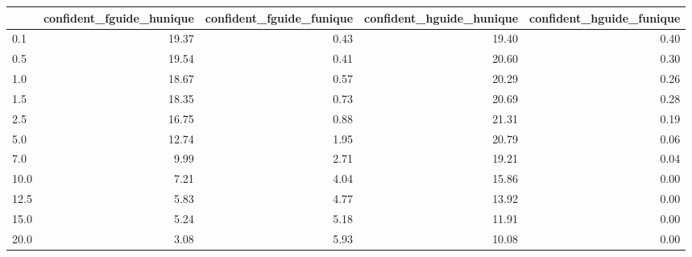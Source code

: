 \begin{tabular}{lrrrr}
\toprule
 & confident_fguide_hunique & confident_fguide_funique & confident_hguide_hunique & confident_hguide_funique \\
\midrule
0.1 & 19.37 & 0.43 & 19.40 & 0.40 \\
0.5 & 19.54 & 0.41 & 20.60 & 0.30 \\
1.0 & 18.67 & 0.57 & 20.29 & 0.26 \\
1.5 & 18.35 & 0.73 & 20.69 & 0.28 \\
2.5 & 16.75 & 0.88 & 21.31 & 0.19 \\
5.0 & 12.74 & 1.95 & 20.79 & 0.06 \\
7.0 & 9.99 & 2.71 & 19.21 & 0.04 \\
10.0 & 7.21 & 4.04 & 15.86 & 0.00 \\
12.5 & 5.83 & 4.77 & 13.92 & 0.00 \\
15.0 & 5.24 & 5.18 & 11.91 & 0.00 \\
20.0 & 3.08 & 5.93 & 10.08 & 0.00 \\
\bottomrule
\end{tabular}
